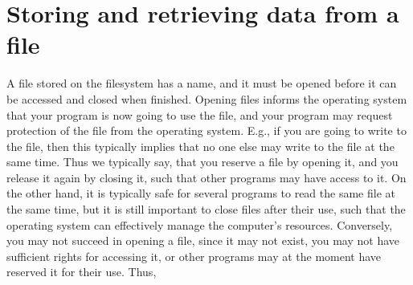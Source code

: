\section{Storing and retrieving data from a file}
A file stored on the filesystem has a name, and it must be opened before it can be accessed and closed when finished. Opening files informs the operating system that your program is now going to use the file, and your program may request protection of the file from the operating system. E.g., if you are going to write to the file, then this typically implies that no one else may write to the file at the same time. Thus we typically say, that you reserve a file by opening it, and you release it again by closing it, such that other programs may have access to it. On the other hand, it is typically safe for several programs to read the same file at the same time, but it is still important to close files after their use, such that the operating system can effectively manage the computer's resources. Conversely, you may not succeed in opening a file, since it may not exist, you may not have sufficient rights for accessing it, or other programs may at the moment have reserved it for their use. Thus, 

